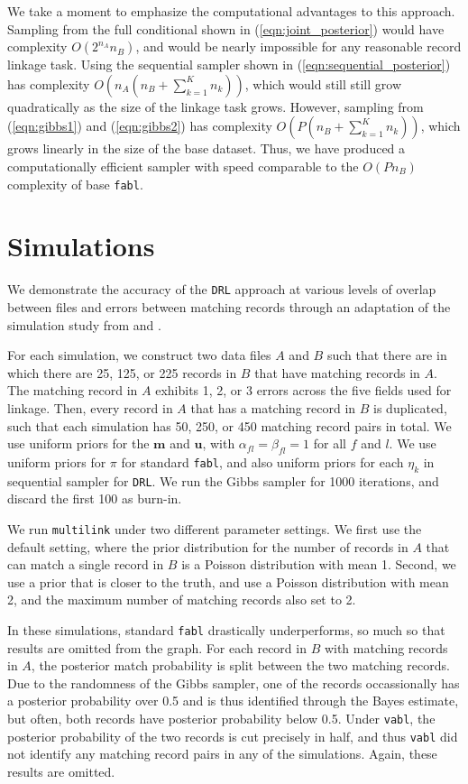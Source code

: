 \documentclass[12pt,letterpaper]{article}
\newcommand{\1}[1]{\mathbb{I}\!\left[#1\right]} %
\begin{document}
We take a moment to emphasize the computational advantages to this approach. Sampling from the full conditional shown in (\ref{eqn:joint_posterior}) would have complexity $O(2^{n_A}n_B)$, and would be nearly impossible for any reasonable record linkage task. Using the sequential sampler shown in (\ref{eqn:sequential_posterior}) has complexity $O\left(n_A (n_B + \sum_{k=1}^K n_k)\right)$, which would still still grow quadratically as the size of the linkage task grows. However, sampling from (\ref{eqn:gibbs1}) and (\ref{eqn:gibbs2}) has complexity $O\left(P (n_B + \sum_{k=1}^K n_k)\right)$, which grows linearly in the size of the base dataset. Thus, we have produced a computationally efficient sampler with speed comparable to the $O(P n_B)$ complexity of base \texttt{fabl}.

\section{Simulations}\label{sec:simulations}

We demonstrate the accuracy of the \texttt{DRL} approach at various levels of overlap between files and errors between matching records through an adaptation of the simulation study from \cite{sadinle_bayesian_2017} and \cite{kundinger_2023}. 

For each simulation, we construct two data files $A$ and $B$ such that there are in which there are 25, 125, or 225 records in $B$ that have matching records in $A$. The matching record in $A$ exhibits 1, 2, or 3 errors across the five fields used for linkage. Then, every record in $A$ that has a matching record in $B$ is duplicated, such that each simulation has 50, 250, or 450 matching record pairs in total. We use uniform priors for the $\bm{m}$ and $\bm{u}$, with $\alpha_{fl} = \beta_{fl} = 1$ for all $f$ and $l$. We use uniform priors for $\pi$ for standard \texttt{fabl}, and also uniform priors for each $\eta_k$ in sequential sampler for \texttt{DRL}. We run the Gibbs sampler for 1000 iterations, and discard the first 100 as burn-in.

We run \texttt{multilink} under two different parameter settings. We first use the default setting, where the prior distribution for the number of records in $A$ that can match a single record in $B$ is a Poisson distribution with mean 1. Second, we use a prior that is closer to the truth, and use a Poisson distribution with mean 2, and the maximum number of matching records also set to 2. 

In these simulations, standard \texttt{fabl} drastically underperforms, so much so that results are omitted from the graph. For each record in $B$ with matching records in $A$, the posterior match probability is split between the two matching records. Due to the randomness of the Gibbs sampler, one of the records occassionally has a posterior probability over 0.5 and is thus identified through the Bayes estimate, but often, both records have posterior probability below 0.5. Under \texttt{vabl}, the posterior probability of the two records is cut precisely in half, and thus \texttt{vabl} did not identify any matching record pairs in any of the simulations. Again, these results are omitted.
\end{document}
